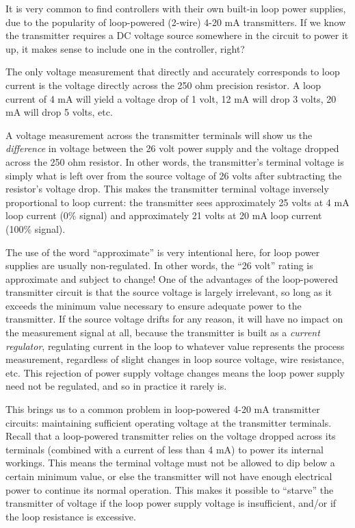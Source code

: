 It is very common to find controllers with their own built-in loop power supplies, due to the popularity of loop-powered (2-wire) 4-20 mA transmitters.  If we know the transmitter requires a DC voltage source somewhere in the circuit to power it up, it makes sense to include one in the controller, right?

The only voltage measurement that directly and accurately corresponds to loop current is the voltage directly across the 250 ohm precision resistor.  A loop current of 4 mA will yield a voltage drop of 1 volt, 12 mA will drop 3 volts, 20 mA will drop 5 volts, etc.  

A voltage measurement across the transmitter terminals will show us the \textit{difference} in voltage between the 26 volt power supply and the voltage dropped across the 250 ohm resistor.  In other words, the transmitter's terminal voltage is simply what is left over from the source voltage of 26 volts after subtracting the resistor's voltage drop.  This makes the transmitter terminal voltage inversely proportional to loop current: the transmitter sees approximately 25 volts at 4 mA loop current (0\% signal) and approximately 21 volts at 20 mA loop current (100\% signal).

The use of the word ``approximate'' is very intentional here, for loop power supplies are usually non-regulated.  In other words, the ``26 volt'' rating is approximate and subject to change!  One of the advantages of the loop-powered transmitter circuit is that the source voltage is largely irrelevant, so long as it exceeds the minimum value necessary to ensure adequate power to the transmitter.  If the source voltage drifts for any reason, it will have no impact on the measurement signal at all, because the transmitter is built as a \textit{current regulator}, regulating current in the loop to whatever value represents the process measurement, regardless of slight changes in loop source voltage, wire resistance, etc.  This rejection of power supply voltage changes means the loop power supply need not be regulated, and so in practice it rarely is.

This brings us to a common problem in loop-powered 4-20 mA transmitter circuits: maintaining sufficient operating voltage at the transmitter terminals.  Recall that a loop-powered transmitter relies on the voltage dropped across its terminals (combined with a current of less than 4 mA) to power its internal workings.  This means the terminal voltage must not be allowed to dip below a certain minimum value, or else the transmitter will not have enough electrical power to continue its normal operation.  This makes it possible to ``starve'' the transmitter of voltage if the loop power supply voltage is insufficient, and/or if the loop resistance is excessive.  

